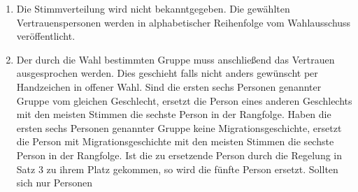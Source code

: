 \documentclass[
  ngerman,
  a4paper,
  oneside]{scrartcl}
\providecommand{\tightlist}{%
  \setlength{\itemsep}{0pt}\setlength{\parskip}{0pt}}
\begin{document}
\begin{enumerate}
  \begin{itemize}
  \tightlist
  \item
    Jede wahlberechtigte Person erhält einen Wahlzettel mit einer Liste
    aller zur Wahl stehenden Personen.
  \item
    Jeder zur Wahl stehenden Person kann eine Stimme gegeben werden.
  \item
    Die Auszählung der Stimmen erfolgt in mehreren Durchgängen.
  \item
    Im ersten Durchgang werden alle Stimmen ausgezählt und die Person
    mit den meisten Stimmen kommt in die Gruppe der gewählten Personen.
    Daraufhin werden alle Wahlzettel, die der ersten gewählten Person
    eine Ja-Stimme gegeben haben, von den übrigen Wahlzetteln getrennt.
  \item
    In den darauf folgenden Durchgängen wird immer die Person mit den
    meisten Stimmen in den verbliebenen Wahlzetteln der Gruppe der
    gewählten Personen hinzugefügt und ihre Wahlzettel von den übrigen
    Wahlzetteln getrennt. Dies wird so lange wiederholt bis alle Plätze
    besetzt sind oder keine Wahlzettel mehr übrig sind.
  \item
    Bei Stimmengleichheit entscheidet die Anzahl der Stimmen aus der
    ersten Runde. Bei Gleichstand entscheidet das Los.
  \item
    Sollten noch nicht alle Plätze in der Gruppe der gewählten Personen
    besetzt sein obwohl keine Wahlzettel mehr verblieben sind, werden
    die restlichen Plätze nach Anzahl der Stimmen in der ersten Runde
    besetzt. Bei Gleichstand entscheidet das Los.
  \end{itemize}
\item
  Die Stimmverteilung wird nicht bekanntgegeben. Die gewählten
  Vertrauenspersonen werden in alphabetischer Reihenfolge vom
  Wahlausschuss veröffentlicht.
\item
  Der durch die Wahl bestimmten Gruppe muss anschließend das Vertrauen
  ausgesprochen werden. Dies geschieht falls nicht anders gewünscht per
  Handzeichen in offener Wahl. Sind die ersten sechs Personen genannter
  Gruppe vom gleichen Geschlecht, ersetzt die Person eines anderen
  Geschlechts mit den meisten Stimmen die sechste Person in der
  Rangfolge. Haben die ersten sechs Personen genannter Gruppe keine
  Migrationsgeschichte, ersetzt die Person mit Migrationsgeschichte mit
  den meisten Stimmen die sechste Person in der Rangfolge. Ist die zu
  ersetzende Person durch die Regelung in Satz 3 zu ihrem Platz
  gekommen, so wird die fünfte Person ersetzt. Sollten sich nur Personen

\end{enumerate}
\end{document}
